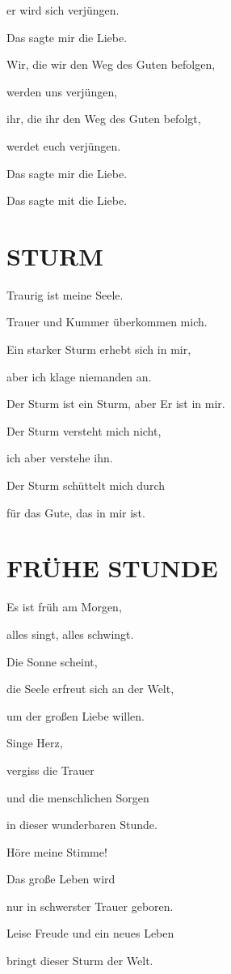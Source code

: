 \documentclass[11pt,a5paper,twoside]{article}
\begin{document}
er wird sich verjüngen. 

Das sagte mir die Liebe. 

Wir, die wir den Weg des Guten befolgen,

werden uns verjüngen, 
 
ihr, die ihr den Weg des Guten befolgt,

werdet euch verjüngen.
 
Das sagte mir die Liebe.
 
Das sagte mit die Liebe. 

\section[Sturm]{STURM}

Traurig ist meine Seele. 

Trauer und Kummer überkommen mich.

Ein starker Sturm erhebt sich in mir,

 aber ich klage niemanden an.

Der Sturm ist ein Sturm, aber Er ist in mir.

Der Sturm versteht mich nicht,

ich aber verstehe ihn.

Der Sturm schüttelt mich durch

für das Gute, das in mir ist.

\section[Frühe Stunden]{FRÜHE STUNDE}

Es ist früh am Morgen, 

alles singt, alles schwingt.

Die Sonne scheint,

die Seele erfreut sich an der Welt, 

um der großen Liebe willen.

Singe Herz, 

vergiss die Trauer

und die menschlichen Sorgen

in dieser wunderbaren Stunde.

Höre meine Stimme! 

Das große Leben wird 

nur in schwerster Trauer geboren. 

Leise Freude und ein neues Leben

bringt dieser Sturm der Welt.
\end{document}
